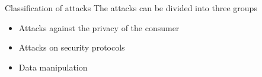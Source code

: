 \begin{frame}{Classification of attacks}
  The attacks can be divided into three groups
  \begin{itemize}
    \item Attacks against the privacy of the consumer
    \item Attacks on security protocols
    \item Data manipulation
  \end{itemize}
\end{frame}
